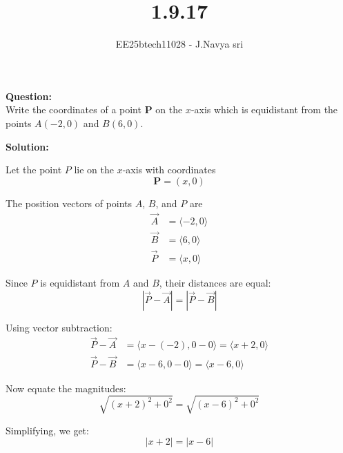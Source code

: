 \documentclass[journal]{IEEEtran}
\begin{document}

\vspace{3cm}

\title{1.9.17}
\author{EE25btech11028 - J.Navya sri}
{\let\newpage\relax\maketitle}



\textbf{Question:} \\
Write the coordinates of a point \(\mathbf{P}\) on the \(x\)-axis which is equidistant from the points 
\(A(-2, 0)\) and \(B(6, 0)\).

\vspace{0.5cm}

\textbf{Solution:}

Let the point \(P\) lie on the \(x\)-axis with coordinates
\begin{equation}
    \mathbf{P} = (x, 0)
\end{equation}

The position vectors of points \(A\), \(B\), and \(P\) are
\begin{align}
    \vec{A} &= \langle -2, 0 \rangle \\
    \vec{B} &= \langle 6, 0 \rangle \\
    \vec{P} &= \langle x, 0 \rangle
\end{align}

Since \(P\) is equidistant from \(A\) and \(B\), their distances are equal:
\begin{equation}
    |\vec{P} - \vec{A}| = |\vec{P} - \vec{B}|
\end{equation}

Using vector subtraction:
\begin{align}
    \vec{P} - \vec{A} &= \langle x - (-2), 0 - 0 \rangle = \langle x + 2, 0 \rangle \\
    \vec{P} - \vec{B} &= \langle x - 6, 0 - 0 \rangle = \langle x - 6, 0 \rangle
\end{align}

Now equate the magnitudes:
\begin{equation}
    \sqrt{(x+2)^2 + 0^2} = \sqrt{(x-6)^2 + 0^2}
\end{equation}

Simplifying, we get:
\begin{equation}
    |x + 2| = |x - 6|
\end{equation}
\end{document}
